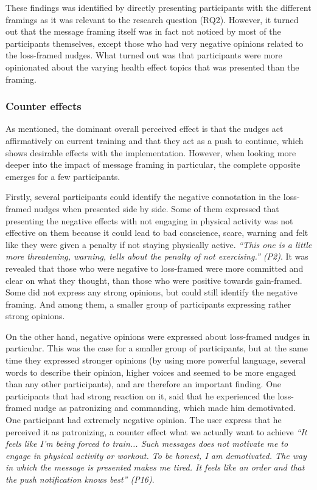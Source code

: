 These findings was identified by directly presenting participants with the different framings as it was relevant to the research question (RQ2). However, it turned out that the message framing itself was in fact not noticed by most of the participants themselves, except those who had very negative opinions related to the loss-framed nudges. What turned out was that participants were more opinionated about the varying health effect topics that was presented than the framing.

\subsubsection{Counter effects}
As mentioned, the dominant overall perceived effect is that the nudges act affirmatively on current training and that they act as a push to continue, which shows desirable effects with the implementation. However, when looking more deeper into the impact of message framing in particular, the complete opposite emerges for a few participants. 

Firstly, several participants could identify the negative connotation in the loss-framed nudges when presented side by side. Some of them expressed that presenting the negative effects with not engaging in physical activity was not effective on them because it could lead to bad conscience, scare, warning and felt like they were given a penalty if not staying physically active. \textit{“This one is a little more threatening, warning, tells about the penalty of not exercising.” (P2)}. It was revealed that those who were negative to loss-framed were more committed and clear on what they thought, than those who were positive towards gain-framed. Some did not express any strong opinions, but could still identify the negative framing. And among them, a smaller group of participants expressing rather strong opinions.

On the other hand, negative opinions were expressed about loss-framed nudges in particular. This was the case for a smaller group of participants, but at the same time they expressed stronger opinions (by using more powerful language, several words to describe their opinion, higher voices and seemed to be more engaged than any other participants), and are therefore an important finding. One participants that had strong reaction on it, said that he experienced the loss-framed nudge as patronizing and commanding, which made him demotivated. One participant had extremely negative opinion. The user express that he perceived it as patronizing, a counter effect what we actually want to achieve
\textit{“It feels like I'm being forced to train... Such messages does not motivate me to engage in physical activity or workout. To be honest, I am demotivated. The way in which the message is presented makes me tired. It feels like an order and that the push notification knows best” (P16)}.

